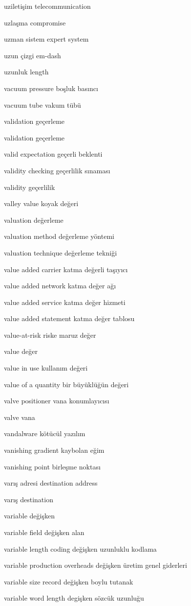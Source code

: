 \documentclass[12pt,fleqn]{article}\usepackage{../../common}
\begin{document}
uziletişim telecommunication

uzlaşma compromise

uzman sistem expert system

uzun çizgi em-dash

uzunluk length

vacuum pressure boşluk basıncı

vacuum tube vakum tübü

validation geçerleme

validation geçerleme

valid expectation geçerli beklenti

validity checking geçerlilik sınaması

validity geçerlilik

valley value koyak değeri

valuation değerleme

valuation method değerleme yöntemi

valuation technique değerleme tekniği

value added carrier katma değerli taşıyıcı

value added network katma değer ağı

value added service katma değer hizmeti

value added statement katma değer tablosu

value-at-risk riske maruz değer

value değer

value in use kullanım değeri

value of a quantity bir büyüklüğün değeri

valve positioner vana konumlayıcısı

valve vana

vandalware kötücül yazılım

vanishing gradient kaybolan eğim

vanishing point birleşme noktası

varış adresi destination address

varış destination

variable değişken

variable field değişken alan

variable length coding değişken uzunluklu kodlama

variable production overheads değişken üretim genel giderleri

variable size record değişken boylu tutanak

variable word length degişken sözcük uzunluğu
\end{document}
